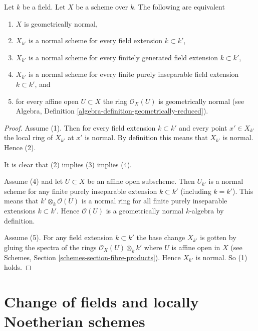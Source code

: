 \begin{lemma}
\label{lemma-geometrically-normal}
Let $k$ be a field.
Let $X$ be a scheme over $k$.
The following are equivalent
\begin{enumerate}
\item $X$ is geometrically normal,
\item $X_{k'}$ is a normal scheme for every field extension $k \subset k'$,
\item $X_{k'}$ is a normal scheme for every finitely generated field
extension $k \subset k'$,
\item $X_{k'}$ is a normal scheme for every finite purely inseparable
field extension $k \subset k'$, and
\item for every affine open $U \subset X$ the ring $\mathcal{O}_X(U)$
is geometrically normal (see
Algebra, Definition \ref{algebra-definition-geometrically-reduced}).
\end{enumerate}
\end{lemma}

\begin{proof}
Assume (1). Then for every field extension $k \subset k'$ and
every point $x' \in X_{k'}$ the local ring of $X_{k'}$ at $x'$
is normal. By definition this means that $X_{k'}$ is normal.
Hence (2).

\medskip\noindent
It is clear that (2) implies (3) implies (4).

\medskip\noindent
Assume (4) and let $U \subset X$ be an affine open subscheme.
Then $U_{k'}$ is a normal scheme for any finite purely inseparable
extension $k \subset k'$ (including $k = k'$). This means that
$k' \otimes_k \mathcal{O}(U)$ is a normal ring for all
finite purely inseparable extensions $k \subset k'$. Hence
$\mathcal{O}(U)$ is a geometrically normal $k$-algebra by definition.

\medskip\noindent
Assume (5). For any field extension $k \subset k'$ the base
change $X_{k'}$ is gotten by gluing the spectra of the
rings $\mathcal{O}_X(U) \otimes_k k'$ where $U$ is affine open
in $X$ (see Schemes, Section \ref{schemes-section-fibre-products}).
Hence $X_{k'}$ is normal. So (1) holds.
\end{proof}












\section{Change of fields and locally Noetherian schemes}
\label{section-locally-Noetherian}

